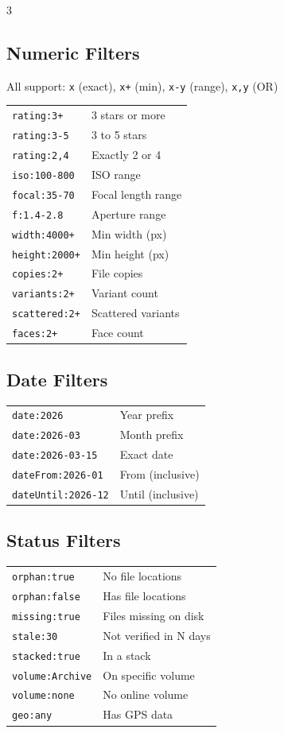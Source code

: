 \documentclass[a4paper,landscape,8pt]{article}
\newcommand{\cmd}[1]{\texttt{\footnotesize #1}}
\begin{document}
\begin{multicols}{3}
\subsection{Numeric Filters}
All support: \cmd{x} (exact), \cmd{x+} (min), \cmd{x-y} (range), \cmd{x,y} (OR)
\begin{tabularx}{\columnwidth}{@{}lX@{}}
\cmd{rating:3+} & 3 stars or more \\
\cmd{rating:3-5} & 3 to 5 stars \\
\cmd{rating:2,4} & Exactly 2 or 4 \\
\cmd{iso:100-800} & ISO range \\
\cmd{focal:35-70} & Focal length range \\
\cmd{f:1.4-2.8} & Aperture range \\
\cmd{width:4000+} & Min width (px) \\
\cmd{height:2000+} & Min height (px) \\
\cmd{copies:2+} & File copies \\
\cmd{variants:2+} & Variant count \\
\cmd{scattered:2+} & Scattered variants \\
\cmd{faces:2+} & Face count \\
\end{tabularx}

\subsection{Date Filters}
\begin{tabularx}{\columnwidth}{@{}lX@{}}
\cmd{date:2026} & Year prefix \\
\cmd{date:2026-03} & Month prefix \\
\cmd{date:2026-03-15} & Exact date \\
\cmd{dateFrom:2026-01} & From (inclusive) \\
\cmd{dateUntil:2026-12} & Until (inclusive) \\
\end{tabularx}

\subsection{Status Filters}
\begin{tabularx}{\columnwidth}{@{}lX@{}}
\cmd{orphan:true} & No file locations \\
\cmd{orphan:false} & Has file locations \\
\cmd{missing:true} & Files missing on disk \\
\cmd{stale:30} & Not verified in N days \\
\cmd{stacked:true} & In a stack \\
\cmd{volume:Archive} & On specific volume \\
\cmd{volume:none} & No online volume \\
\cmd{geo:any} & Has GPS data \\
\end{tabularx}


\end{multicols}
\end{document}
